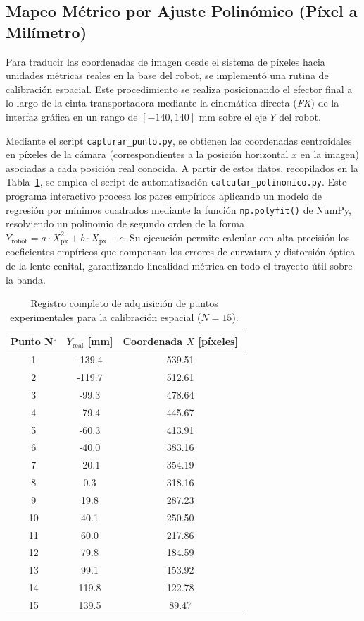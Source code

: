 \documentclass[12pt, a4paper]{report}
\begin{document}
\subsection{Mapeo Métrico por Ajuste Polinómico (Píxel a Milímetro)} 
Para traducir las coordenadas de imagen desde el sistema de píxeles hacia unidades métricas reales en la base del robot, se implementó una rutina de calibración espacial. Este procedimiento se realiza posicionando el efector final a lo largo de la cinta transportadora mediante la cinemática directa (\textit{FK}) de la interfaz gráfica en un rango de $[-140, 140]\text{ mm}$ sobre el eje $Y$ del robot. 

Mediante el script \texttt{capturar\_punto.py}, se obtienen las coordenadas centroidales en píxeles de la cámara (correspondientes a la posición horizontal $x$ en la imagen) asociadas a cada posición real conocida. A partir de estos datos, recopilados en la Tabla~\ref{tab:obtension_puntos_calibracion}, se emplea el script de automatización \texttt{calcular\_polinomico.py}. Este programa interactivo procesa los pares empíricos aplicando un modelo de regresión por mínimos cuadrados mediante la función \texttt{np.polyfit()} de NumPy, resolviendo un polinomio de segundo orden de la forma $Y_{\text{robot}} = a \cdot X_{\text{px}}^2 + b \cdot X_{\text{px}} + c$. Su ejecución permite calcular con alta precisión los coeficientes empíricos que compensan los errores de curvatura y distorsión óptica de la lente cenital, garantizando linealidad métrica en todo el trayecto útil sobre la banda.

\begin{table}[H]
\centering
\small
\begin{tabular}{|c|c|c|}
\hline
\textbf{Punto N$^\circ$} & \textbf{$Y_{\text{real}}$ [mm]} & \textbf{Coordenada $X$ [píxeles]} \\ \hline
1  & -139.4 & 539.51 \\ \hline
2  & -119.7 & 512.61 \\ \hline
3  & -99.3  & 478.64 \\ \hline
4  & -79.4  & 445.67 \\ \hline
5  & -60.3  & 413.91 \\ \hline
6  & -40.0  & 383.16 \\ \hline
7  & -20.1  & 354.19 \\ \hline
8  &   0.3  & 318.16 \\ \hline
9  &  19.8  & 287.23 \\ \hline
10 &  40.1  & 250.50 \\ \hline
11 &  60.0  & 217.86 \\ \hline
12 &  79.8  & 184.59 \\ \hline
13 &  99.1  & 153.92 \\ \hline
14 & 119.8  & 122.78 \\ \hline
15 & 139.5  &  89.47 \\ \hline
\end{tabular}
\caption{Registro completo de adquisición de puntos experimentales para la calibración espacial ($N = 15$).}
\label{tab:obtension_puntos_calibracion}
\end{table}
\end{document}
